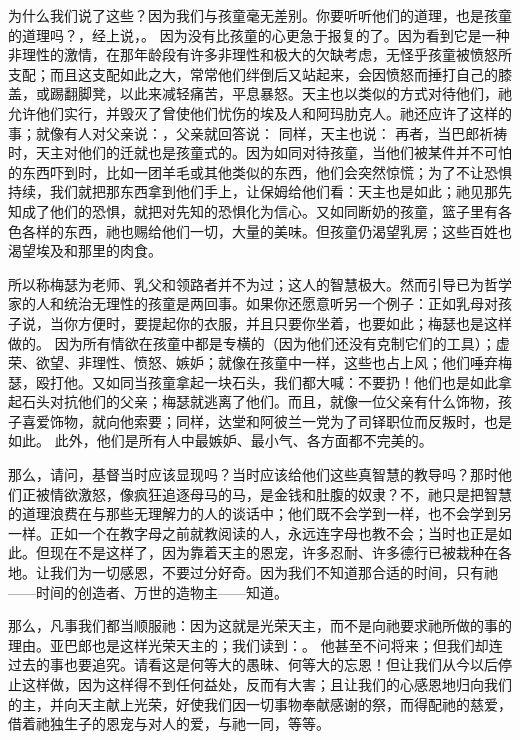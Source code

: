为什么我们说了这些？因为我们与孩童毫无差别。你要听听他们的道理，也是孩童的道理吗？，经上说，。 因为没有比孩童的心更急于报复的了。因为看到它是一种非理性的激情，在那年龄段有许多非理性和极大的欠缺考虑，无怪乎孩童被愤怒所支配；而且这支配如此之大，常常他们绊倒后又站起来，会因愤怒而捶打自己的膝盖，或踢翻脚凳，以此来减轻痛苦，平息暴怒。天主也以类似的方式对待他们，祂允许他们实行，并毁灭了曾使他们忧伤的埃及人和阿玛肋克人。祂还应许了这样的事；就像有人对父亲说：，父亲就回答说： 同样，天主也说： 再者，当巴郎祈祷时，天主对他们的迁就也是孩童式的。因为如同对待孩童，当他们被某件并不可怕的东西吓到时，比如一团羊毛或其他类似的东西，他们会突然惊慌；为了不让恐惧持续，我们就把那东西拿到他们手上，让保姆给他们看：天主也是如此；祂见那先知成了他们的恐惧，就把对先知的恐惧化为信心。又如同断奶的孩童，篮子里有各色各样的东西，祂也赐给他们一切，大量的美味。但孩童仍渴望乳房；这些百姓也渴望埃及和那里的肉食。\par

所以称梅瑟为老师、乳父和领路者并不为过；这人的智慧极大。然而引导已为哲学家的人和统治无理性的孩童是两回事。如果你还愿意听另一个例子：正如乳母对孩子说，当你方便时，要提起你的衣服，并且只要你坐着，也要如此；梅瑟也是这样做的。 因为所有情欲在孩童中都是专横的（因为他们还没有克制它们的工具）；虚荣、欲望、非理性、愤怒、嫉妒；就像在孩童中一样，这些也占上风；他们唾弃梅瑟，殴打他。又如同当孩童拿起一块石头，我们都大喊：不要扔！他们也是如此拿起石头对抗他们的父亲；梅瑟就逃离了他们。而且，就像一位父亲有什么饰物，孩子喜爱饰物，就向他索要；同样，达堂和阿彼兰一党为了司铎职位而反叛时，也是如此。 此外，他们是所有人中最嫉妒、最小气、各方面都不完美的。\par

那么，请问，基督当时应该显现吗？当时应该给他们这些真智慧的教导吗？那时他们正被情欲激怒，像疯狂追逐母马的马，是金钱和肚腹的奴隶？不，祂只是把智慧的道理浪费在与那些无理解力的人的谈话中；他们既不会学到一样，也不会学到另一样。正如一个在教字母之前就教阅读的人，永远连字母也教不会；当时也正是如此。但现在不是这样了，因为靠着天主的恩宠，许多忍耐、许多德行已被栽种在各地。让我们为一切感恩，不要过分好奇。因为我们不知道那合适的时间，只有祂——时间的创造者、万世的造物主——知道。\par

那么，凡事我们都当顺服祂：因为这就是光荣天主，而不是向祂要求祂所做的事的理由。亚巴郎也是这样光荣天主的；我们读到：。 他甚至不问将来；但我们却连过去的事也要追究。请看这是何等大的愚昧、何等大的忘恩！但让我们从今以后停止这样做，因为这样得不到任何益处，反而有大害；且让我们的心感恩地归向我们的主，并向天主献上光荣，好使我们因一切事物奉献感谢的祭，而得配祂的慈爱，借着祂独生子的恩宠与对人的爱，与祂一同，等等。\par

